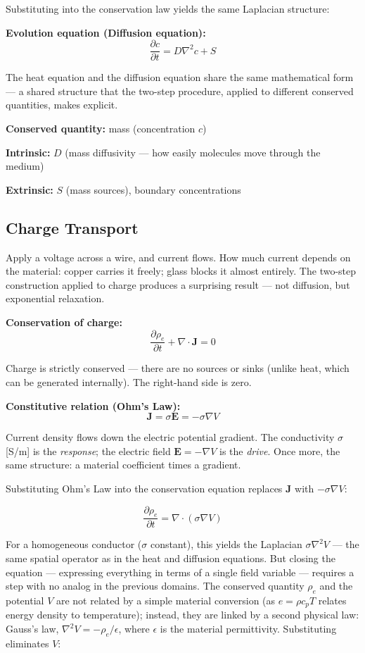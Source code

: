\documentclass[
  letterpaper,
  DIV=11,
  numbers=noendperiod]{scrartcl}
\begin{document}
Substituting into the conservation law yields the same Laplacian
structure:

\textbf{Evolution equation (Diffusion equation):}
\[\frac{\partial c}{\partial t} = D\nabla^2 c + S\]

The heat equation and the diffusion equation share the same mathematical
form --- a shared structure that the two-step procedure, applied to
different conserved quantities, makes explicit.

\textbf{Conserved quantity:} mass (concentration \(c\))

\textbf{Intrinsic:} \(D\) (mass diffusivity --- how easily molecules
move through the medium)

\textbf{Extrinsic:} \(S\) (mass sources), boundary concentrations

\subsection{Charge Transport}\label{charge-transport}

Apply a voltage across a wire, and current flows. How much current
depends on the material: copper carries it freely; glass blocks it
almost entirely. The two-step construction applied to charge produces a
surprising result --- not diffusion, but exponential relaxation.

\textbf{Conservation of charge:}
\[\frac{\partial \rho_e}{\partial t} + \nabla \cdot \mathbf{J} = 0\]

Charge is strictly conserved --- there are no sources or sinks (unlike
heat, which can be generated internally). The right-hand side is zero.

\textbf{Constitutive relation (Ohm's Law):}
\[\mathbf{J} = \sigma \mathbf{E} = -\sigma \nabla V\]

Current density flows down the electric potential gradient. The
conductivity \(\sigma\) {[}S/m{]} is the \emph{response}; the electric
field \(\mathbf{E} = -\nabla V\) is the \emph{drive}. Once more, the
same structure: a material coefficient times a gradient.

Substituting Ohm's Law into the conservation equation replaces
\(\mathbf{J}\) with \(-\sigma \nabla V\):

\[\frac{\partial \rho_e}{\partial t} = \nabla \cdot (\sigma \nabla V)\]

For a homogeneous conductor (\(\sigma\) constant), this yields the
Laplacian \(\sigma \nabla^2 V\) --- the same spatial operator as in the
heat and diffusion equations. But closing the equation --- expressing
everything in terms of a single field variable --- requires a step with
no analog in the previous domains. The conserved quantity \(\rho_e\) and
the potential \(V\) are not related by a simple material conversion (as
\(e = \rho c_p T\) relates energy density to temperature); instead, they
are linked by a second physical law: Gauss's law,
\(\nabla^2 V = -\rho_e/\epsilon\), where \(\epsilon\) is the material
permittivity. Substituting eliminates \(V\):
\end{document}

